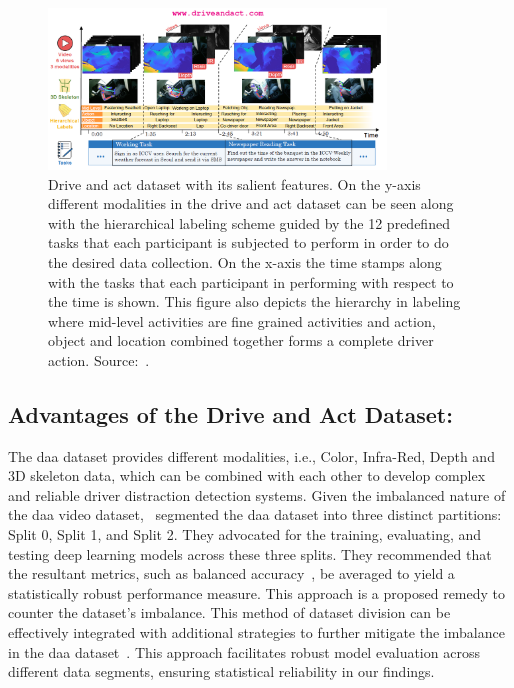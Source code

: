 \begin{figure}[htbp]
\begin{center}
\includegraphics[width=0.8\textwidth]{Images_Thesis/daa_images/Capture_daa_thesis.PNG}
\end{center}
\caption[Drive and act dataset with its salient features.]{Drive and act dataset with its salient features. On the y-axis different modalities in the drive and act dataset can be seen along with the hierarchical labeling scheme guided by the 12 predefined tasks that each participant is subjected to perform in order to do the desired data collection. On the x-axis the time stamps along with the tasks that each participant in performing with respect to the time is shown. This figure also depicts the hierarchy in labeling where mid-level activities are fine grained activities and action, object and location combined together forms a complete driver action. Source:~\citep{martin2019drive_and_act_2019_iccv}.}
\label{fig:driveandact_salient_features}
\end{figure}

\subsection{Advantages of the Drive and Act Dataset:}
The \gls{daa} dataset provides different modalities, i.e., Color, Infra-Red, Depth and 3D skeleton data, which can be combined with each other to develop complex and reliable driver distraction detection systems. Given the imbalanced nature of the \gls{daa} video dataset,~\citet{martin2019drive_and_act_2019_iccv} segmented the \gls{daa} dataset into three distinct partitions: Split 0, Split 1, and Split 2. They advocated for the training, evaluating, and testing deep learning models across these three splits. They recommended that the resultant metrics, such as balanced accuracy~\citep{bal_acc_paper_brodersen2010balanced}, be averaged to yield a statistically robust performance measure. This approach is a proposed remedy to counter the dataset's imbalance. This method of dataset division can be effectively integrated with additional strategies to further mitigate the imbalance in the \gls{daa} dataset~\citep{martin2019drive_and_act_2019_iccv}. This approach facilitates robust model evaluation across different data segments, ensuring statistical reliability in our findings. 


